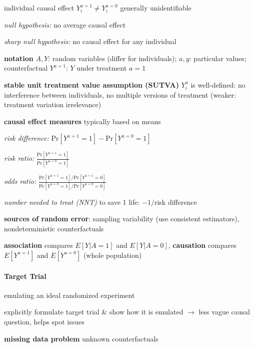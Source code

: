 \documentclass[8pt]{extarticle}
\begin{document}
\begin{multicols}{2}
\noindent individual causal effect $Y_i^{a=1} \neq Y_i^{a=0}$ generally unidentifiable

\noindent \textit{null hypothesis:} no average causal effect

\noindent \textit{sharp null hypothesis:} no causal effect for any individual

\noindent \textbf{notation} $A,Y$: random variables (differ for individuals);
$a,y$: particular values; counterfactual $Y^{a=1}$: $Y$ under treatment $a=1$

\noindent  \textbf{stable unit treatment value assumption (SUTVA)} $Y_i^a$ is well-defined: no interference between individuals, no multiple versions of treatment (weaker: treatment variation irrelevance)

\noindent  \textbf{causal effect measures} typically based on means

\textit{risk difference:}  $\mathrm{Pr}\left[Y^{a=1}=1\right] - \mathrm{Pr}\left[Y^{a=0}=1\right]$

\textit{risk ratio:} $\frac{\mathrm{Pr}\left[Y^{a=1}=1\right]}{ \mathrm{Pr}\left[Y^{a=0}=1\right]}$

\textit{odds ratio:} $\frac{\mathrm{Pr}\left[Y^{a=1}=1\right]/\mathrm{Pr}\left[Y^{a=1}=0\right]}{ \mathrm{Pr}\left[Y^{a=0}=1\right]/\mathrm{Pr}\left[Y^{a=0}=0\right]}$

\noindent \textit{number needed to treat (NNT)} to save 1 life: $-1/$risk difference

\noindent \textbf{sources of random error}: sampling variability (use consistent estimators), nondeterministic counterfactuals

\noindent\textbf{association} compares $E\left[Y|A=1\right]$ and $E\left[Y|A=0\right]$, \textbf{causation} compares $E\left[Y^{a=1}\right]$ and $E\left[Y^{a=0}\right]$ (whole population)









\paragraph{\large Target Trial} emulating an ideal randomized experiment

\noindent explicitly formulate target trial \& show how it is emulated $\rightarrow$ \newline less vague causal question, helps spot issues

\noindent \textbf{missing data problem} unknown counterfactuals


\end{multicols}
\end{document}
